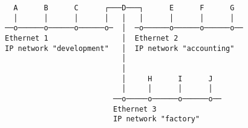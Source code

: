 \documentclass[varwidth=30cm,crop]{standalone}
\begin{document}
\begin{verbatim}
  A      B      C      ┌───D───┐      E      F      G
  │      │      │      │   │   │      │      │      │   
──o──────o──────o──────o─  │  ─o──────o──────o──────o──
Ethernet 1                 │  Ethernet 2
IP network "development"   │  IP network "accounting"
                           │
                           │
                           │     H      I      J
                           │     │      │      │
                         ──o─────o──────o──────o──
                         Ethernet 3
                         IP network "factory"
\end{verbatim}
\end{document}
